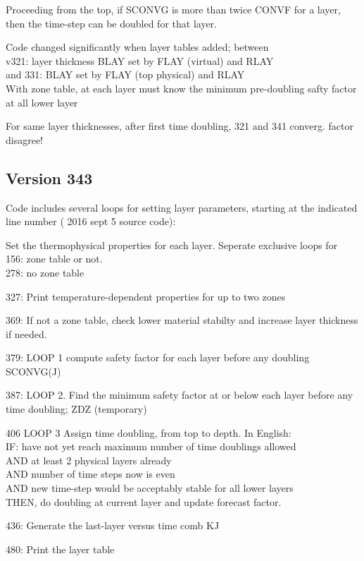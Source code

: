 \documentclass{article}
\newcommand{\qi}{\\ \hspace*{2.em}}      %
\begin{document}
Proceeding from the top, if SCONVG is more than twice CONVF for a layer, then
the time-step can be doubled for that layer.

Code changed significantly when layer tables added; between 
\qi v321: layer thickness BLAY set by FLAY (virtual) and RLAY 
\qi and 331: BLAY set by FLAY (top physical) and RLAY
\\ With zone table, at each layer must know the minimum pre-doubling safty factor at all lower layer

For same layer thicknesses, after first time doubling, 321 and 341
converg. factor disagree!

\subsection {Version 343}

Code includes several loops for setting layer parameters, starting at the
indicated line number ( 2016 sept 5 source code):

Set the thermophysical properties for each layer. Seperate exclusive loops for
\qi  156:  zone table or not.
\qi  278: no zone table

327: Print temperature-dependent properties for up to two zones 

369: If not a zone table, check lower material stabilty and increase layer
thickness if needed.

379: LOOP 1 compute safety factor for each layer before any doubling SCONVG(J)

387: LOOP 2. Find the minimum safety factor at or below each layer before any
time doubling; ZDZ (temporary)

406 LOOP 3 Assign time doubling, from top to depth. In English: 
\qi IF:  have not yet reach maximum number of time doublings allowed 
\qi AND at least 2 physical layers already 
\qi AND number of time steps now is even
\qi AND new time-step would be acceptably stable for all lower layers
\\ THEN, do doubling at current layer and update forecast factor.

436: Generate the last-layer versus time comb KJ

480: Print the layer table
\end{document}
